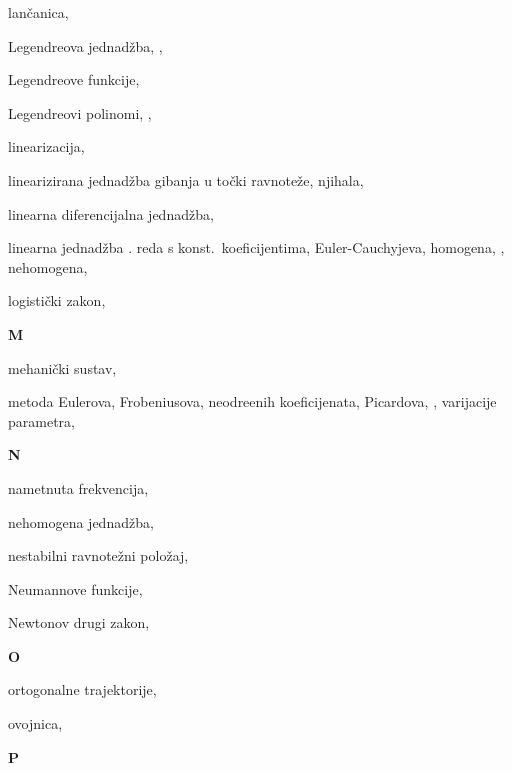 \begin{theindex}
  \item lan\v canica, 
  \item Legendreova jednad\v zba, , 
  \item Legendreove funkcije, 
  \item Legendreovi polinomi, , 
  \item linearizacija, 
  \item linearizirana jednad\v zba
    \subitem gibanja u to\v cki ravnote\v ze, 
    \subitem njihala, 
  \item linearna diferencijalna jednad\v zba, 
  \item linearna jednad\v zba
    . reda s konst.~koeficijentima, 
    \subitem Euler-Cauchyjeva, 
    \subitem homogena, , 
    \subitem nehomogena, 
  \item logisti\v cki zakon, 

  \indexspace
{\bfseries\hfil M\hfil}\nopagebreak

  \item mehani\v cki sustav, 
  \item metoda
    \subitem Eulerova, 
    \subitem Frobeniusova, 
    \subitem neodre\IeC {\dj }enih koeficijenata, 
    \subitem Picardova, , 
    \subitem varijacije parametra, 

  \indexspace
{\bfseries\hfil N\hfil}\nopagebreak

  \item nametnuta frekvencija, 
  \item nehomogena jednad\v zba, 
  \item nestabilni ravnote\v zni polo\v zaj, 
  \item Neumannove funkcije, 
  \item Newtonov drugi zakon, 

  \indexspace
{\bfseries\hfil O\hfil}\nopagebreak

  \item ortogonalne trajektorije, 
  \item ovojnica, 

  \indexspace
{\bfseries\hfil P\hfil}\nopagebreak


\end{theindex}
